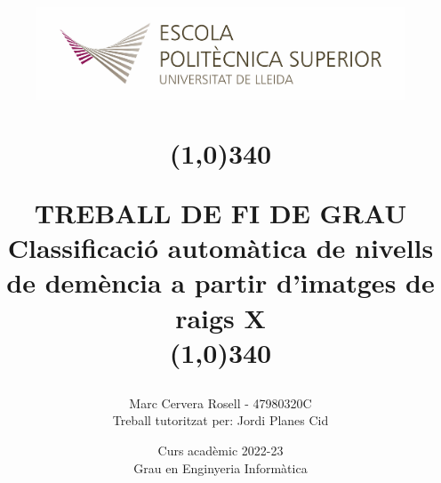 \title{
	\begin{center}
	\vspace{3cm}
	\includegraphics[width=11cm, height=3cm]{images/Logo-nou-eps.jpg}
	\end{center}
	\begin{center}
	\line(1,0){340}
	\end{center}		
	TREBALL DE FI DE GRAU\\
	\vspace{2mm}
	\Large Classificació automàtica de nivells de demència a partir d'imatges de raigs X\\
	\line(1,0){340}
	\vspace{2.5cm}
	}

\author{Marc Cervera Rosell - 47980320C \vspace{0.5cm}\\
\small{Treball tutoritzat per: Jordi Planes Cid} \vspace{1.0cm}}


\date{Curs acadèmic 2022-23\vspace{0.5cm} \\Grau en Enginyeria Informàtica}